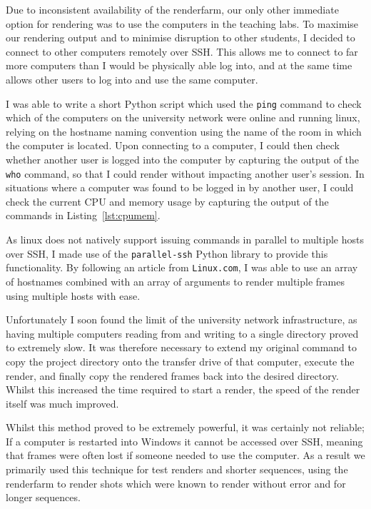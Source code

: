 \documentclass[11pt]{article}
\begin{document}
Due to inconsistent availability of the renderfarm, our only other immediate option for rendering was to use the computers in the teaching labs. To maximise our rendering output and to minimise disruption to other students, I decided to connect to other computers remotely over SSH. This allows me to connect to far more computers than I would be physically able log into, and at the same time allows other users to log into and use the same computer.

I was able to write a short Python script which used the \texttt{ping} command to check which of the computers on the university network were online and running linux, relying on the hostname naming convention using the name of the room in which the computer is located. Upon connecting to a computer, I could then check whether another user is logged into the computer by capturing the output of the \texttt{who} command, so that I could render without impacting another user's session. In situations where a computer was found to be logged in by another user, I could check the current CPU and memory usage by capturing the output of the commands in Listing~\ref{lst:cpumem}.

As linux does not natively support issuing commands in parallel to multiple hosts over SSH, I made use of the \texttt{parallel-ssh}\cite{pssh} Python library to provide this functionality. By following an article from \texttt{Linux.com}\cite{martin_2008}, I was able to use an array of hostnames combined with an array of arguments to render multiple frames using multiple hosts with ease.

Unfortunately I soon found the limit of the university network infrastructure, as having multiple computers reading from and writing to a single directory proved to extremely slow. It was therefore necessary to extend my original command to copy the project directory onto the transfer drive of that computer, execute the render, and finally copy the rendered frames back into the desired directory. Whilst this increased the time required to start a render, the speed of the render itself was much improved.

Whilst this method proved to be extremely powerful, it was certainly not reliable; If a computer is restarted into Windows it cannot be accessed over SSH, meaning that frames were often lost if someone needed to use the computer. As a result we primarily used this technique for test renders and shorter sequences, using the renderfarm to render shots which were known to render without error and for longer sequences.
\end{document}
